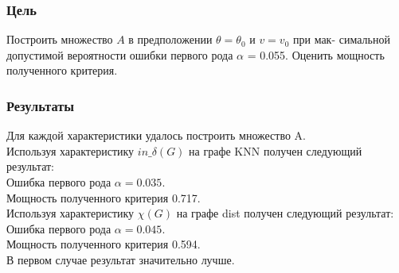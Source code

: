 \documentclass[a4paper, 12pt]{article}
\begin{document}
\subsubsection{Цель}
Построить множество $A$ в предположении $\theta = \theta_0$ и $v = v_0$ при мак-
симальной допустимой вероятности ошибки первого рода $\alpha$ = 0.055.
Оценить мощность полученного критерия.
\subsubsection{Результаты}
Для каждой характеристики удалось построить множество A.\\
Используя характеристику $in\_\delta(G)$ на графе KNN получен следующий результат:\\
Ошибка первого рода $\alpha = 0.035.$\\
Мощность полученного критерия 0.717.\\
Используя характеристику $\chi(G)$ на графе dist получен следующий результат:\\
Ошибка первого рода $\alpha = 0.045.$\\
Мощность полученного критерия 0.594.\\
В первом случае результат значительно лучше.\\
\end{document}
